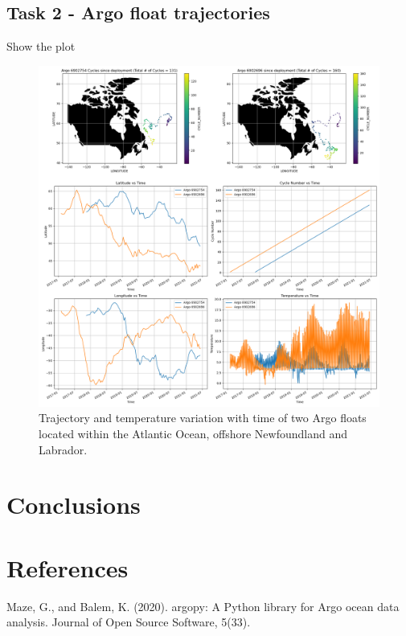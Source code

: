 \documentclass{article}
\begin{document}
\subsection{Task 2 - Argo float trajectories}

Show the plot

\begin{figure}[!ht]
\includegraphics[width=\textwidth,height=\textheight,keepaspectratio]{argo_trajectory.png}
\caption{Trajectory and temperature variation with time of two Argo floats located within the Atlantic Ocean, offshore Newfoundland and Labrador.}
\end{figure}
 
 

\section{Conclusions}

\section{References}

Maze, G., and Balem, K. (2020). argopy: A Python library for Argo ocean data analysis. Journal of Open Source Software, 5(33).
\end{document}
